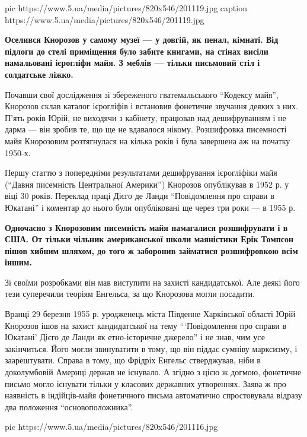\ifcmt
pic https://www.5.ua/media/pictures/820x546/201119.jpg
caption https://www.5.ua/media/pictures/820x546/201119.jpg
\fi

\begin{leftbar}
\bfseries
Оселився Кнорозов у самому музеї --- у довгій, як пенал, кімнаті. Від
підлоги до стелі приміщення було забите книгами, на стінах висіли
намальовані ієрогліфи майя. З меблів --- тільки письмовий стіл і
солдатське ліжко.
\end{leftbar}

Почавши свої дослідження зі збереженого гватемальського \enquote{Кодексу майя},
Кнорозов склав каталог ієрогліфів і встановив фонетичне звучання деяких з
них. П'ять років Юрій, не виходячи з кабінету, працював над дешифруванням
і не дарма --- він зробив те, що ще не вдавалося нікому. Розшифровка
писемності майя Кнорозовим розтягнулася на кілька років і була завершена
аж на початку 1950-х.

Першу статтю з попередніми результатами дешифрування ієрогліфіки майя
(\enquote{Давня писемність Центральної Америки}) Кнорозов опублікував в 1952 р. у
віці 30 років. Переклад праці Дієго де Ланди \enquote{Повідомлення про справи в
Юкатані} і коментар до нього були опубліковані ще через три роки --- в 1955
р.

\begin{leftbar}
\bfseries
Одночасно з Кнорозовим писемність майя намагалися розшифрувати і в США.
От тільки чільник американської школи маяністики Ерік Томпсон пішов
хибним шляхом, до того ж заборонив займатися розшифровкою всім іншим.
\end{leftbar}

Зі своїми розробками він мав виступити на захисті кандидатської. Але деякі
його тези суперечили теоріям Енгельса, за що Кнорозова могли посадити.

Вранці 29 березня 1955 р. уродженець міста Південне Харківської області
Юрій Кнорозов ішов на захист кандидатської на тему 
\enquote{\enquote{Повідомлення про справи в Юкатані} 
Дієго де Ланди як етно-історичне джерело} і не знав, чим
усе закінчиться. Його могли звинуватити в тому, що він піддає сумніву
марксизму, і заарештувати. Справа в тому, що Фрідріх Енгельс стверджував,
ніби в доколумбовій Америці держав не існувало. А згідно з цією ж догмою,
фонетичне письмо могло існувати тільки у класових державних утвореннях.
Заява ж про наявність в індійців-майя фонетичного письма автоматично
спростовувала відразу два положення \enquote{основоположника}.

\ifcmt
pic https://www.5.ua/media/pictures/820x546/201116.jpg
\fi

